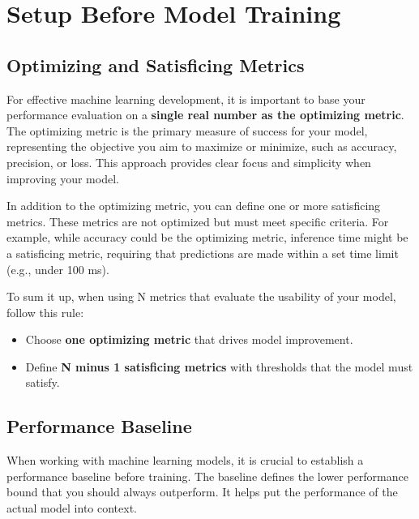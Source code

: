 \documentclass[12pt,openany, draft]{book}
\begin{document}
\chapter{Setup Before Model Training}



\section{Optimizing and Satisficing Metrics}

For effective machine learning development, it is important to base your performance evaluation on a \textbf{single real number as the optimizing metric}. The optimizing metric is the primary measure of success for your model, representing the objective you aim to maximize or minimize, such as accuracy, precision, or loss. This approach provides clear focus and simplicity when improving your model. \newline

In addition to the optimizing metric, you can define one or more satisficing metrics. These metrics are not optimized but must meet specific criteria. For example, while accuracy could be the optimizing metric, inference time might be a satisficing metric, requiring that predictions are made within a set time limit (e.g., under 100 ms). \newline \newline

To sum it up, when using N metrics that evaluate the usability of your model, follow this rule:
\begin{itemize}
    \item Choose \textbf{one optimizing metric} that drives model improvement.
    \item Define \textbf{N minus 1 satisficing metrics} with thresholds that the model must satisfy.
\end{itemize}



\section{Performance Baseline} \label{sec:performance_baseline}

When working with machine learning models, it is crucial to establish a performance baseline before training. The baseline defines the lower performance bound that you should always outperform. It helps put the performance of the actual model into context. \newline
\end{document}
